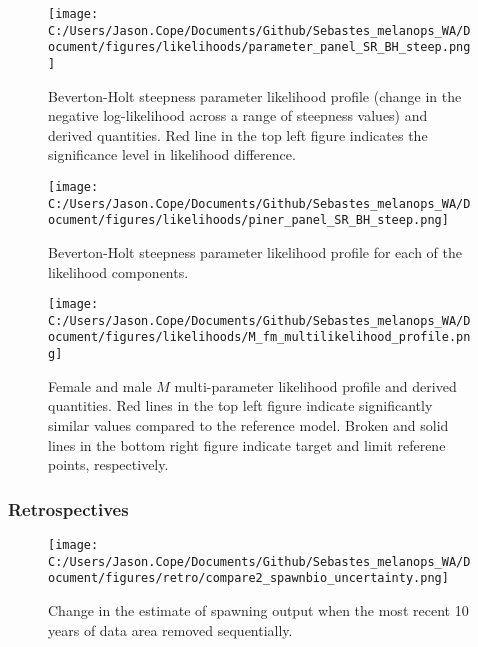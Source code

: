 \documentclass[11pt,
  english,
  letterpaper,
]{article}
\begin{document}
\pagebreak

\begin{figure}
\centering
\texttt{[image: C:/Users/Jason.Cope/Documents/Github/Sebastes\_melanops\_WA/Document/figures/likelihoods/parameter\_panel\_SR\_BH\_steep.png]}
\caption{Beverton-Holt steepness parameter likelihood profile (change in the negative log-likelihood across a range of steepness values) and derived quantities. Red line in the top left figure indicates the significance level in likelihood difference.\label{fig:steepness-profile}}
\end{figure}

\pagebreak

\begin{figure}
\centering
\texttt{[image: C:/Users/Jason.Cope/Documents/Github/Sebastes\_melanops\_WA/Document/figures/likelihoods/piner\_panel\_SR\_BH\_steep.png]}
\caption{Beverton-Holt steepness parameter likelihood profile for each of the likelihood components.\label{fig:steepness-profile-components}}
\end{figure}

\pagebreak

\begin{figure}
\centering
\texttt{[image: C:/Users/Jason.Cope/Documents/Github/Sebastes\_melanops\_WA/Document/figures/likelihoods/M\_fm\_multilikelihood\_profile.png]}
\caption{Female and male \(M\) multi-parameter likelihood profile and derived quantities. Red lines in the top left figure indicate significantly similar values compared to the reference model. Broken and solid lines in the bottom right figure indicate target and limit referene points, respectively.\label{fig:M-multiprofile-combo}}
\end{figure}

\pagebreak

\hypertarget{retrospectives}{%
\subsubsection{Retrospectives}\label{retrospectives}}

\begin{figure}
\centering
\texttt{[image: C:/Users/Jason.Cope/Documents/Github/Sebastes\_melanops\_WA/Document/figures/retro/compare2\_spawnbio\_uncertainty.png]}
\caption{Change in the estimate of spawning output when the most recent 10 years of data area removed sequentially.\label{fig:retro-ssb}}
\end{figure}
\end{document}
